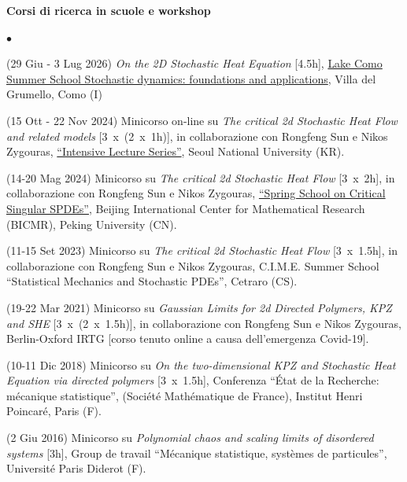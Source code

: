 \documentclass[a4paper,11pt,oneside]{amsart}
\newenvironment{myitemize}{%
\begin{list}{$\bullet$}%
 	{%
	\setlength{\itemsep}{0.3em}%
	\setlength{\topsep}{0.3em}%
	\setlength{\partopsep}{0em}%
	\setlength{\parsep}{0em}%
	\setlength{\parskip}{0em}%
	\setlength\leftmargin{1.5em}%
	\setlength\labelwidth{1.1em}%
	\setlength{\labelsep}{0.4em}%
	}%
	}%
{\end{list}}
\renewenvironment{itemize}{
\begin{myitemize}}%
{\end{myitemize}}
\begin{document}
%


\medskip
{\large\sf \bfseries Corsi di ricerca in scuole e workshop}
\smallskip
\label{sec:corsiscuole}

\begin{itemize}
\item (29 Giu - 3 Lug 2026)
\emph{On the 2D Stochastic Heat Equation} [4.5h],
\href{https://sdfa.lakecomoschool.org/}{Lake Como Summer School Stochastic dynamics: foundations and applications},
Villa del Grumello, Como (I)

\item  (15 Ott - 22 Nov 2024)
Minicorso on-line su \emph{The critical 2d Stochastic Heat Flow and related models} 
[3~x~(2~x~1h)],
in collaborazione con Rongfeng Sun e Nikos Zygouras,
\href{https://sites.google.com/view/snuprob/seminar/intensive-lecture-series}{``Intensive Lecture Series''},
Seoul National University (KR).

\item (14-20 Mag 2024)
Minicorso su \emph{The critical 2d Stochastic Heat Flow} [3~x~2h],
in collaborazione con Rongfeng Sun e Nikos Zygouras,
\href{https://bicmr.pku.edu.cn/content/show/17-3296.html}{``Spring School on Critical Singular SPDEs''},
Beijing International Center for Mathematical Research (BICMR),
Peking University (CN).

\item (11-15 Set 2023)
Minicorso su \emph{The critical 2d Stochastic Heat Flow} [3~x~1.5h],
in collaborazione con Rongfeng Sun e Nikos Zygouras,
C.I.M.E. Summer School ``Statistical Mechanics and Stochastic PDEs'',
Cetraro (CS).

\item (19-22 Mar 2021)
Minicorso su \emph{Gaussian Limits for 2d Directed Polymers, KPZ and SHE} [3~x~(2~x~1.5h)],
in collaborazione con Rongfeng Sun e Nikos Zygouras,
Berlin-Oxford IRTG [corso tenuto online a causa
dell'emergenza Covid-19].

\item (10-11 Dic 2018)
Minicorso su \emph{On the two-dimensional KPZ and Stochastic Heat Equation 
via directed polymers} [3~x~1.5h],
Conferenza
``État de la Recherche: mécanique statistique'',
(Société Mathématique de France),
Institut Henri Poincaré, Paris (F).

\item (2 Giu 2016)
Minicorso su \emph{Polynomial chaos and scaling limits of disordered systems} [3h],
Group de travail ``Mécanique statistique, systèmes de particules'',
Université Paris Diderot (F).


\end{itemize}
\end{document}
